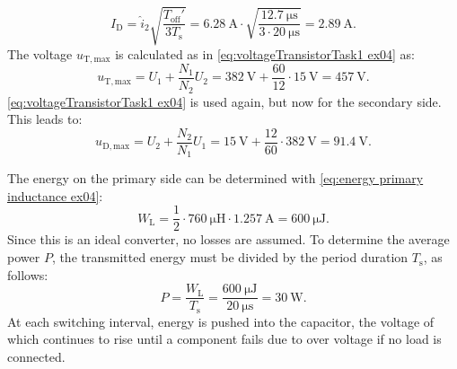 \begin{solutionblock}
    \begin{equation}
        I_\mathrm{D} = \hat i_\mathrm{2} \sqrt{\frac{T_\mathrm{off}'}{3T_\mathrm{s}}}= \SI{6.28}{\ampere}\cdot\sqrt{\frac{\SI{12.7}{\micro\s}}{3\cdot\SI{20}{\micro\s}}}= \SI{2.89}{\ampere}.
    \end{equation}
    The voltage  $u_\mathrm{T,max}$ is calculated as in \eqref{eq:voltageTransistorTask1 ex04} as:
    \begin{equation}
        u_\mathrm{T,max} = U_\mathrm{1} + \frac{N_\mathrm{1}}{N_\mathrm{2}}U_\mathrm{2}= \SI{382}{\volt}+\frac{60}{12}\cdot\SI{15}{\volt}= \SI{457}{\volt}.
    \end{equation}
    \eqref{eq:voltageTransistorTask1 ex04} is used again, but now for the secondary side. This leads to:
    \begin{equation}
        u_\mathrm{D,max} = U_\mathrm{2} + \frac{N_\mathrm{2}}{N_\mathrm{1}}U_\mathrm{1}= \SI{15}{\volt}+\frac{12}{60}\cdot\SI{382}{\volt}= \SI{91.4}{\volt}.
    \end{equation}

\end{solutionblock}


\begin{solutionblock}
    The energy on the primary side can be determined with \eqref{eq:energy primary inductance ex04}:
    \begin{equation}
        W_\mathrm{L} = \frac{1}{2}\cdot \SI{760}{\micro\henry} \cdot \SI{1.257}{\ampere} = \SI{600}{\micro\joule}.
    \end{equation}
    Since this is an ideal converter, no losses are assumed. 
    To determine the average power ${P}$, the transmitted energy must be divided by the period duration $T_\mathrm{s}$, as follows:
    \begin{equation}
        {P} = \frac{W_\mathrm{L}}{T_\mathrm{s}} = \frac{\SI{600}{\micro\joule}}{\SI{20}{\micro\s}}=\SI{30}{\watt}.
    \end{equation}
At each switching interval, energy is pushed into the capacitor, the voltage of which continues to rise until a component fails due to over voltage if no load is connected.
\end{solutionblock}

